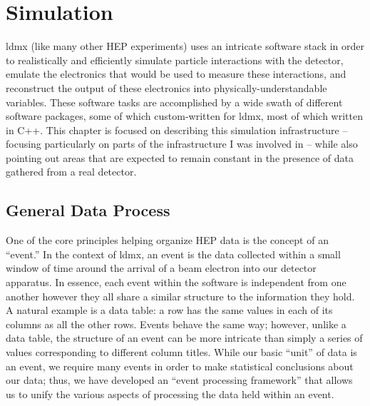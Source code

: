 \chapter{Simulation}
\label{chapter:ldmx:simulation}

\ac{ldmx} (like many other HEP experiments) uses an intricate software stack in order to realistically and efficiently simulate particle interactions with the detector, emulate the electronics that would be used to measure these interactions, and reconstruct the output of these electronics into physically-understandable variables.
These software tasks are accomplished by a wide swath of different software packages, some of which custom-written for \ac{ldmx}, most of which written in C++.
This chapter is focused on describing this simulation infrastructure -- focusing particularly on parts of the infrastructure I was involved in -- while also pointing out areas that are expected to remain constant in the presence of data gathered from a real detector.

\section{General Data Process}
One of the core principles helping organize HEP data is the concept of an ``event.''
In the context of \ac{ldmx}, an event is the data collected within a small window of time around the arrival of a beam electron into our detector apparatus.
In essence, each event within the software is independent from one another however they all share a similar structure to the information they hold. A natural example is a data table: a row has the same values in each of its columns as all the other rows. Events behave the same way; however, unlike a data table, the structure of an event can be more intricate than simply a series of values corresponding to different column titles.
While our basic ``unit'' of data is an event, we require many events in order to make statistical conclusions about our data; thus, we have developed an ``event processing framework'' that allows us to unify the various aspects of processing the data held within an event.

